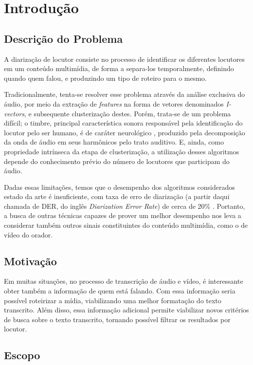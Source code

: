 \chapter{Introdução}

\section{Descrição do Problema}

A diarização de locutor consiste no processo de identificar os diferentes locutores em um conteúdo multimídia, de forma a separa-los temporalmente, definindo quando quem falou, e produzindo um tipo de roteiro para o mesmo.

Tradicionalmente, tenta-se resolver esse problema através da análise exclusiva do áudio, por meio da extração de \textit{features} na forma de vetores denominados \textit{I-vectors}, e subsequente clusterização destes. Porém, trata-se de um problema difícil; o timbre, principal característica sonora responsável pela identificação do locutor pelo ser humano, é de caráter neurológico \cite{oxenhamPitchPerception2012}, produzido pela decomposição da onda de áudio em seus harmônicos pelo trato auditivo. E, ainda, como propriedade intrínseca da etapa de clusterização, a utilização desses algoritmos depende do conhecimento prévio do número de locutores que participam do áudio. 

Dadas essas limitações, temos que o desempenho dos algoritmos considerados estado da arte é insuficiente, com taxa de erro de diarização (a partir daqui chamada de DER, do inglês \textit{Diarization Error Rate}) de cerca de 20\% \cite{zewoudieUseLongtermFeatures2018}. Portanto, a busca de outras técnicas capazes de prover um melhor desempenho nos leva a considerar também outros sinais constituintes do conteúdo multimídia, como o de vídeo do orador.

\section{Motivação}

Em muitas situações, no processo de transcrição de áudio e vídeo, é interessante obter também a informação de quem está falando. Com essa informação seria possível roteirizar a mídia, viabilizando uma melhor formatação do texto transcrito. Além disso, essa informação adicional permite viabilizar novos critérios de busca sobre o texto transcrito, tornando possível filtrar os resultados por locutor.

\section{Escopo}

